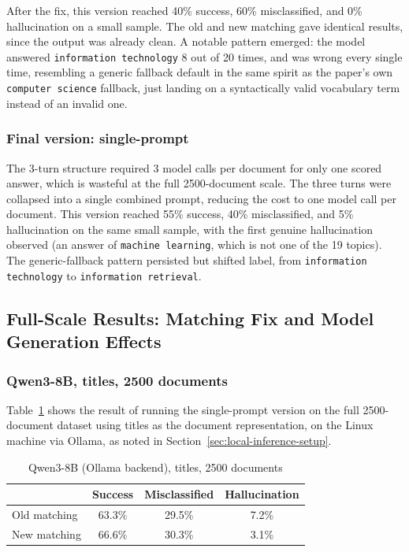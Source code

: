 After the fix, this version reached 40\% success, 60\% misclassified, and 0\% hallucination on a small sample. The old and new matching gave identical results, since the output was already clean. A notable pattern emerged: the model answered \texttt{information technology} 8 out of 20 times, and was wrong every single time, resembling a generic fallback default in the same spirit as the paper's own \texttt{computer science} fallback, just landing on a syntactically valid vocabulary term instead of an invalid one.

\subsubsection{Final version: single-prompt}

The 3-turn structure required 3 model calls per document for only one scored answer, which is wasteful at the full 2500-document scale. The three turns were collapsed into a single combined prompt, reducing the cost to one model call per document. This version reached 55\% success, 40\% misclassified, and 5\% hallucination on the same small sample, with the first genuine hallucination observed (an answer of \texttt{machine learning}, which is not one of the 19 topics). The generic-fallback pattern persisted but shifted label, from \texttt{information technology} to \texttt{information retrieval}.

\subsection{Full-Scale Results: Matching Fix and Model Generation Effects}
\label{sec:full-scale-results}

\subsubsection{Qwen3-8B, titles, 2500 documents}

Table~\ref{tab:qwen-titles-2500} shows the result of running the single-prompt version on the full 2500-document dataset using titles as the document representation, on the Linux machine via Ollama, as noted in Section~\ref{sec:local-inference-setup}.

\begin{table}[h]
\centering
\caption{Qwen3-8B (Ollama backend), titles, 2500 documents}
\label{tab:qwen-titles-2500}
\begin{tabular}{lccc}
\toprule
 & Success & Misclassified & Hallucination \\
\midrule
Old matching & 63.3\% & 29.5\% & 7.2\% \\
New matching & 66.6\% & 30.3\% & 3.1\% \\
\bottomrule
\end{tabular}
\end{table}

